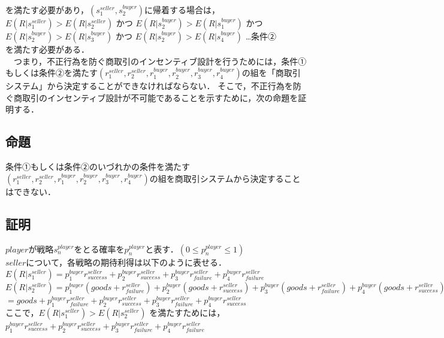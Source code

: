 \documentclass[twocolumn, a4j]{article}
\begin{document}
を満たす必要があり，$(s^{seller}_1, s^{buyer}_2)$に帰着する場合は，\\

$E(R|s^{seller}_1)>E(R|s^{seller}_2)$
かつ
$E(R|s^{buyer}_2)>E(R|s^{buyer}_1)$
かつ
$E(R|s^{buyer}_2) > E(R|s^{buyer}_3)$
かつ
$E(R|s^{buyer}_2) > E(R|s^{buyer}_4)$ …条件②\\

を満たす必要がある．\\

　つまり，不正行為を防ぐ商取引のインセンティブ設計を行うためには，条件①もしくは条件②を満たす$(r^{seller}_1, r^{seller}_2, r^{buyer}_1, r^{buyer}_2, r^{buyer}_3, r^{buyer}_4)$の組を「商取引システム」から決定することができなければならない．
そこで，不正行為を防ぐ商取引のインセンティブ設計が不可能であることを示すために，次の命題を証明する．

\subsection{命題}
条件①もしくは条件②のいづれかの条件を満たす$(r^{seller}_1, r^{seller}_2, r^{buyer}_1, r^{buyer}_2, r^{buyer}_3, r^{buyer}_4)$の組を商取引システムから決定することはできない．

\subsection{証明}
$player$が戦略$s^{player}_n$をとる確率を$p^{player}_{n}$と表す．$(0 \leq p^{player}_{n} \leq 1)$\\

$seller$について，各戦略の期待利得は以下のように表せる．　\\
$E(R|s^{seller}_1)=p^{buyer}_1{r}^{seller}_{success}+p^{buyer}_2r^{seller}_{suceess}+p^{buyer}_3r^{seller}_{failure}+p^{buyer}_4r^{seller}_{failure}$ \\

$ E(R |s^{seller}_2) = p^{buyer}_1 (goods + r^{seller}_{failure}) + p^{buyer}_2 (goods + r^{seller}_{success}) + p^{buyer}_3 (goods + r^{seller}_{failure} ) + p^{buyer}_4 (goods + r^{seller}_{success})$ \\

$ = goods + p^{buyer}_1 r^{seller}_{failure} + p^{buyer}_2 r^{seller}_{success} + p^{buyer}_3 r^{seller}_{failure} + p^{buyer}_4 r^{seller}_{success}$ \\

ここで，$E(R |s^{seller}_1) > E(R |s^{seller}_2)$ を満たすためには， \\
$p^{buyer}_1 {r}^{seller}_{success} + p^{buyer}_2 r^{seller}_{suceess} + p^{buyer}_3 r^{seller}_{failure} + p^{buyer}_4 r^{seller}_{failure}$ \\
\end{document}
